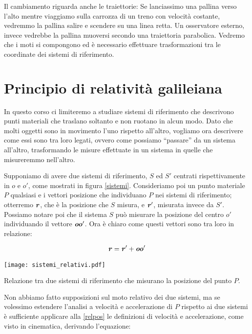 Il cambiamento riguarda anche le traiettorie: Se lanciassimo una pallina
verso l'alto mentre viaggiamo sulla carrozza di un treno con velocità
costante, vedremmo la pallina salire e scendere su una linea retta.
Un osservatore esterno, invece vedrebbe la pallina muoversi secondo
una traiettoria parabolica. Vedremo che i moti si compongono
ed è necessario effettuare trasformazioni tra le coordinate dei
sistemi di riferimento.


\section{Principio di relatività galileiana}
In questo corso ci limiteremo a studiare sistemi di riferimento che
descrivono punti materiali che traslano soltanto e non ruotano in
alcun modo. Dato che molti oggetti sono in movimento l'uno rispetto
all'altro, vogliamo ora descrivere come essi sono tra loro legati,
ovvero come possiamo ``passare'' da un sistema all'altro, trasformando
le misure effettuate in un sistema in quelle che misureremmo nell'altro.

Supponiamo di avere due sistemi di riferimento, $S$ ed $S'$
centrati rispettivamente in $o$ e $o'$, come mostrati in figura
\ref{sistemi}. Consideriamo poi un punto materiale $P$ qualsiasi
e i vettori posizione che individuano $P$ nei sistemi di riferimento;
otterremo $\textbf{\textit{r}}$, che è la posizione che $S$ misura,
e $\textbf{\textit{r}}'$, misurata invece da $S'$. Possiamo notare poi che il
sistema $S$ può misurare la posizione del centro $o'$ individuando
il vettore $\textbf{\textit{oo}}'$. Ora è chiaro come questi vettori sono
tra loro in relazione:

\begin{align}
    \textbf{\textit{r}} = \textbf{\textit{r}}' + \textbf{\textit{oo}}'\label{relpos}
\end{align}


\begin{marginfigure}
    \centering
    \texttt{[image: sistemi\_relativi.pdf]}
    \caption{Relazione tra due sistemi di riferimento che misurano
    la posizione del punto $P$.}
    \label{sistemi}
\end{marginfigure}

\noindent Non abbiamo fatto supposizioni sul moto relativo dei
due sistemi, ma se volessimo estendere l'analisi a velocità e
accelerazione di $P$ rispetto ai due sistemi è sufficiente
applicare alla \ref{relpos} le definizioni di velocità e accelerazione,
come visto in cinematica, derivando l'equazione:

